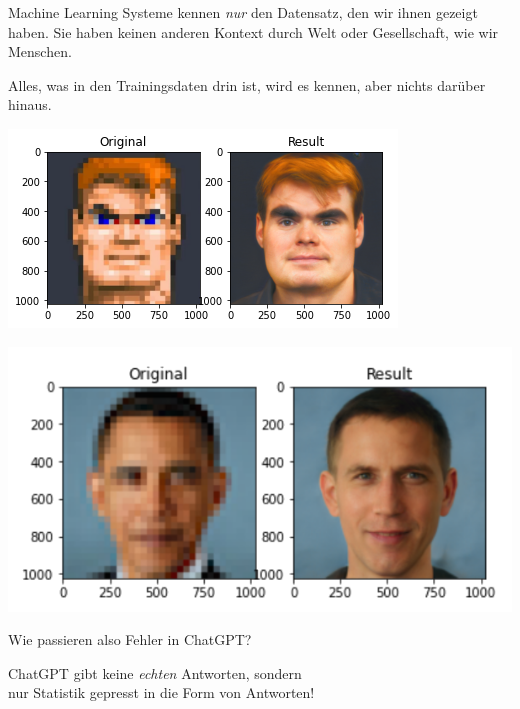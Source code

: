 \documentclass[aspectratio=169,usenames,dvipsnames]{beamer}
\begin{document}
\begin{frame}
\begin{minipage}{0.45\textwidth}
\large
Machine Learning Systeme kennen \emph{nur} den Datensatz, den wir ihnen gezeigt haben.
Sie haben keinen anderen Kontext durch Welt oder Gesellschaft, wie wir Menschen.
\bigskip

Alles, was in den Trainingsdaten drin ist, wird es kennen, aber nichts darüber hinaus.
\end{minipage}\hfill\begin{minipage}{0.5\textwidth}
\begin{center}
\pause
\includegraphics[height=0.45\textheight]{images/doomguy}
\pause

\includegraphics[height=0.45\textheight]{images/obama} 
\end{center}
\end{minipage}
\end{frame}

\begin{frame}
\begin{center}
\Large
Wie passieren also Fehler in ChatGPT?
\pause
\bigskip\bigskip

ChatGPT gibt keine \emph{echten} Antworten, sondern\\ nur Statistik gepresst in die Form von Antworten!
\end{center}
\end{frame}
\end{document}
